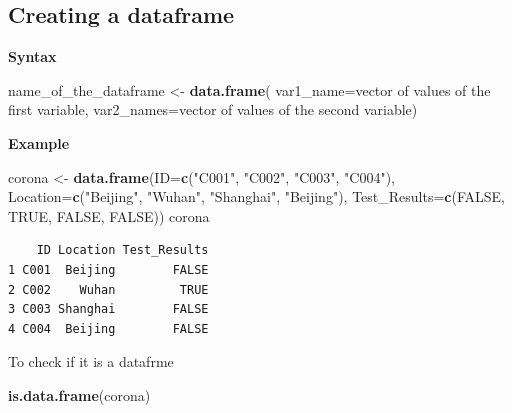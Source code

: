 \documentclass[]{book}
\newenvironment{Shaded}{\begin{snugshade}}{\end{snugshade}}
\newcommand{\DataTypeTok}[1]{\textcolor[rgb]{0.13,0.29,0.53}{#1}}
\newcommand{\KeywordTok}[1]{\textcolor[rgb]{0.13,0.29,0.53}{\textbf{#1}}}
\newcommand{\NormalTok}[1]{#1}
\newcommand{\OtherTok}[1]{\textcolor[rgb]{0.56,0.35,0.01}{#1}}
\newcommand{\StringTok}[1]{\textcolor[rgb]{0.31,0.60,0.02}{#1}}
\begin{document}
\hypertarget{creating-a-dataframe}{%
\subsection{Creating a dataframe}\label{creating-a-dataframe}}

\textbf{Syntax}

\begin{Shaded}
\begin{Highlighting}[]
\NormalTok{name_of_the_dataframe <-}\StringTok{ }\KeywordTok{data.frame}\NormalTok{(}
                          \DataTypeTok{var1_name=}\NormalTok{vector of values of the first variable,}
                          \DataTypeTok{var2_names=}\NormalTok{vector of values of the second variable)}
\end{Highlighting}
\end{Shaded}

\textbf{Example}

\begin{Shaded}
\begin{Highlighting}[]
\NormalTok{corona <-}\StringTok{ }\KeywordTok{data.frame}\NormalTok{(}\DataTypeTok{ID=}\KeywordTok{c}\NormalTok{(}\StringTok{"C001"}\NormalTok{, }\StringTok{"C002"}\NormalTok{, }\StringTok{"C003"}\NormalTok{, }\StringTok{"C004"}\NormalTok{),}
                     \DataTypeTok{Location=}\KeywordTok{c}\NormalTok{(}\StringTok{"Beijing"}\NormalTok{, }\StringTok{"Wuhan"}\NormalTok{, }\StringTok{"Shanghai"}\NormalTok{, }\StringTok{"Beijing"}\NormalTok{),}
                     \DataTypeTok{Test_Results=}\KeywordTok{c}\NormalTok{(}\OtherTok{FALSE}\NormalTok{, }\OtherTok{TRUE}\NormalTok{, }\OtherTok{FALSE}\NormalTok{, }\OtherTok{FALSE}\NormalTok{))}
\NormalTok{corona}
\end{Highlighting}
\end{Shaded}

\begin{verbatim}
    ID Location Test_Results
1 C001  Beijing        FALSE
2 C002    Wuhan         TRUE
3 C003 Shanghai        FALSE
4 C004  Beijing        FALSE
\end{verbatim}

To check if it is a datafrme

\begin{Shaded}
\begin{Highlighting}[]
\KeywordTok{is.data.frame}\NormalTok{(corona)}
\end{Highlighting}
\end{Shaded}
\end{document}
